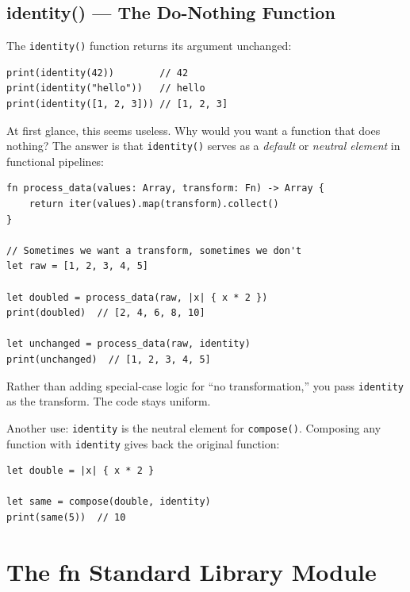 \subsection{identity() --- The Do-Nothing Function}\label{subsec:identity}

The \lstinline|identity()| function returns its argument unchanged:

\begin{lstlisting}[language=Lattice, caption={The identity function}]
print(identity(42))        // 42
print(identity("hello"))   // hello
print(identity([1, 2, 3])) // [1, 2, 3]
\end{lstlisting}

At first glance, this seems useless.
Why would you want a function that does nothing?
The answer is that \lstinline|identity()| serves as a \emph{default} or \emph{neutral element} in functional pipelines:

\begin{lstlisting}[language=Lattice, caption={identity() as a default transform}]
fn process_data(values: Array, transform: Fn) -> Array {
    return iter(values).map(transform).collect()
}

// Sometimes we want a transform, sometimes we don't
let raw = [1, 2, 3, 4, 5]

let doubled = process_data(raw, |x| { x * 2 })
print(doubled)  // [2, 4, 6, 8, 10]

let unchanged = process_data(raw, identity)
print(unchanged)  // [1, 2, 3, 4, 5]
\end{lstlisting}

Rather than adding special-case logic for ``no transformation,'' you pass \lstinline|identity| as the transform.
The code stays uniform.

Another use: \lstinline|identity| is the neutral element for \lstinline|compose()|.
Composing any function with \lstinline|identity| gives back the original function:

\begin{lstlisting}[language=Lattice, caption={identity() as composition neutral}]
let double = |x| { x * 2 }

let same = compose(double, identity)
print(same(5))  // 10
\end{lstlisting}

\section{The fn Standard Library Module}\label{sec:fn-stdlib}

